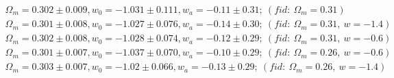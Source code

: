 \documentclass[useAMS,usenatbib]{mnras}
\begin{document}
\begin{eqnarray}
 \Omega_m = 0.302 \pm 0.009, w_0 = -1.031 \pm 0.111, w_a = -0.11 \pm 0.31;\ (fid:\ \Omega_m=0.31)\\
\Omega_m = 0.301 \pm 0.008, w_0 = -1.027 \pm 0.076, w_a = -0.14 \pm 0.30;\ (fid:\ \Omega_m=0.31,\ w=-1.4)\\
\Omega_m = 0.302 \pm 0.008, w_0 = -1.028 \pm 0.074, w_a = -0.12 \pm 0.29;\ (fid:\ \Omega_m=0.31,\ w=-0.6)\\
\Omega_m = 0.301 \pm 0.007, w_0 = -1.037 \pm 0.070, w_a = -0.10 \pm 0.29;\ (fid:\ \Omega_m=0.26,\ w=-0.6)\\
\Omega_m = 0.303 \pm 0.007, w_0 = -1.02 \pm 0.066, w_a = -0.13 \pm 0.29;\ (fid:\ \Omega_m=0.26,\ w=-1.4)\\

\end{eqnarray}
\end{document}
